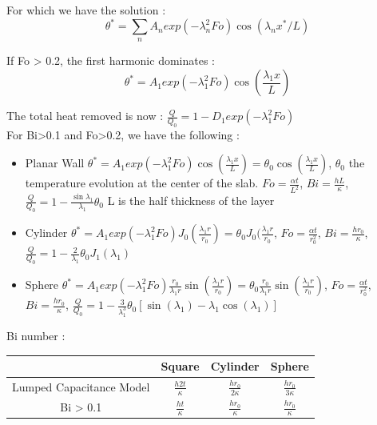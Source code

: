 \documentclass[../main.tex]{subfiles}
\begin{document}
For which we have the solution : \begin{equation}
    \theta^* = \sum_n A_n exp(-\lambda_n^2 Fo)\cos(\lambda_n x^*/L)
\end{equation}

\warning If Fo > 0.2, the first harmonic dominates : \begin{equation}
    \theta^* = A_1 exp(-\lambda_1^2 Fo) \cos(\frac{\lambda_1 x}{L})
\end{equation}

The total heat removed is now : $\frac{Q}{Q_0} = 1-D_1 exp(-\lambda_1^2 Fo)$\\

For Bi>0.1 and Fo>0.2, we have the following : \begin{itemize}
    \item Planar Wall $\theta^* = A_1 exp(-\lambda_1^2 Fo) \cos(\frac{\lambda_1 x}{L}) = \theta_0 \cos(\frac{\lambda_1 x}{L})$, $\theta_0$ the temperature evolution at the center of the slab. $Fo = \frac{\alpha t}{L^2}$, $Bi = \frac{hL}{\kappa}$, $\frac{Q}{Q_0} = 1-\frac{\sin \lambda_1}{\lambda_1} \theta_0$ \warning L is the half thickness of the layer\\
    \item Cylinder $\theta^* = A_1 exp(-\lambda_1^2 Fo) J_0 (\frac{\lambda_1 r}{r_0}) = \theta_0 J_0 (\frac{\lambda_1 r}{r_0}$, $Fo = \frac{\alpha t}{r_0^2}$, $Bi = \frac{h r_0}{\kappa}$, $\frac{Q}{Q_0} = 1-\frac{2}{\lambda_1}\theta_0 J_1 (\lambda_1)$\\
    \item Sphere $\theta^* = A_1 exp(-\lambda_1^2 Fo) \frac{r_0}{\lambda_1 r} \sin(\frac{\lambda_1 r}{r_0}) = \theta_0 \frac{r_0}{\lambda_1 r} \sin(\frac{\lambda_1 r}{r_0})$, $Fo = \frac{\alpha t}{r_0^2}$, $Bi = \frac{h r_0}{\kappa}$, $\frac{Q}{Q_0} = 1-\frac{3}{\lambda_1^3} \theta_0 [\sin(\lambda_1) - \lambda_1 \cos(\lambda_1)]$\\
\end{itemize}

Bi number : \begin{table}[hbt!]
    \centering
    \begin{tabular}{c|c|c|c}
         & Square & Cylinder & Sphere \\
         \hline 
        Lumped Capacitance Model & $\frac{h2t}{\kappa}$ & $\frac{h r_0}{2\kappa}$ & $\frac{h r_0}{3\kappa}$\\
        Bi > 0.1 & $\frac{ht}{\kappa}$ & $\frac{h r_0}{\kappa}$ & $\frac{h r_0}{\kappa}$\\
    \end{tabular}
\end{table}
\end{document}
